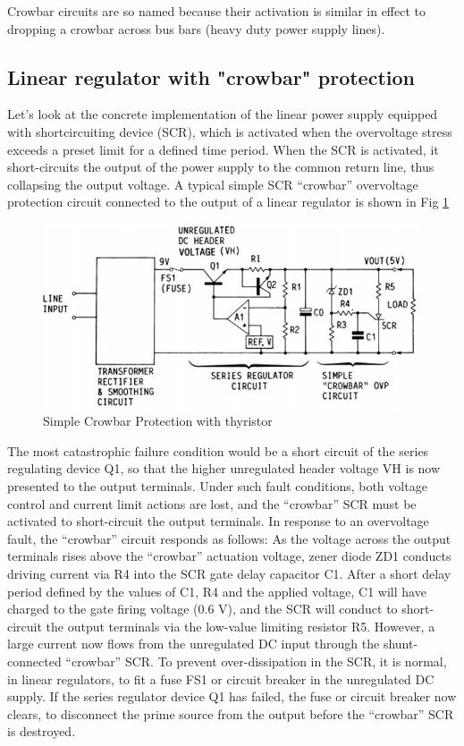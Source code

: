 \documentclass[journal]{IEEEtran}
\begin{document}
    Crowbar circuits are so named because their activation is similar in effect to dropping a 
    crowbar across bus bars (heavy duty power supply lines).

    \subsection{Linear regulator with "crowbar" protection}

    Let's look at the concrete implementation of the linear power supply equipped with 
    shortcircuiting device (SCR), which is activated when the overvoltage stress exceeds a preset 
    limit for a defined time period. When the SCR is activated, it short-circuits the output of the 
    power supply to the common return line, thus collapsing the output voltage. A typical simple 
    SCR “crowbar” overvoltage protection circuit connected to the output of a linear regulator is 
    shown in Fig \ref{HW002:fig007}
    
    \begin{figure}[!ht] %
      \centering
      \includegraphics[width=1\linewidth]{fig_HW007.png}
      \caption{Simple Crowbar Protection with thyristor}
      \label{HW002:fig007}
    \end{figure}
    
    The most catastrophic failure condition would be a short circuit of the series regulating
    device Q1, so that the higher unregulated header voltage VH is now presented to the output
    terminals. Under such fault conditions, both voltage control and current limit actions are
    lost, and the “crowbar” SCR must be activated to short-circuit the output terminals.
    In response to an overvoltage fault, the “crowbar” circuit responds as follows: As the
    voltage across the output terminals rises above the “crowbar” actuation voltage, zener
    diode ZD1 conducts driving current via R4 into the SCR gate delay capacitor C1. After a
    short delay period defined by the values of C1, R4 and the applied voltage, C1 will have
    charged to the gate firing voltage (0.6 V), and the SCR will conduct to short-circuit the
    output terminals via the low-value limiting resistor R5. However, a large current now flows
    from the unregulated DC input through the shunt-connected “crowbar” SCR. To prevent
    over-dissipation in the SCR, it is normal, in linear regulators, to fit a fuse FS1 or circuit
    breaker in the unregulated DC supply. If the series regulator device Q1 has failed, the fuse
    or circuit breaker now clears, to disconnect the prime source from the output before the
    “crowbar” SCR is destroyed.
\end{document}
